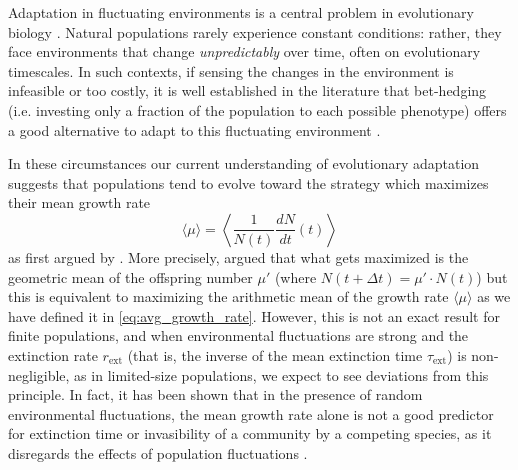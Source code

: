 \documentclass[aps,pre,reprint,10pt,superscriptaddress]{revtex4-2}
\begin{document}
Adaptation in fluctuating environments is a central problem in evolutionary biology \cite{gillespieNaturalSelectionVariances1977,kingscollegeRiskUncertaintyEvolutionary1982,kussellPhenotypicDiversityPopulation2005,ashcroftFixationFinitePopulations2014,patraEmergencePhenotypeSwitching2015,huftonIntrinsicNoiseSystems2016,wienandEvolutionFluctuatingPopulation2017,saakianAlleleFixationProbability2019,taitelbaumPopulationDynamicsChanging2020,camachomateuPhenotypicdependentVariabilityEmergence2021,kaushikTimeFixationChanging2021,collectiveEconomicPrinciplesCell,nakashimaPopulationDynamicsModels2023}. Natural populations rarely experience constant conditions: rather, they face environments that change \emph{unpredictably} over time, often on evolutionary timescales. In such contexts, if sensing the changes in the environment is infeasible or too costly, it is well established in the literature that bet-hedging (i.e. investing only a fraction of the population to each possible phenotype) offers a good alternative to adapt to this fluctuating environment \cite{kussellPhenotypicDiversityPopulation2005,patraEmergencePhenotypeSwitching2015,huftonPhenotypicSwitchingPopulations2018,camachomateuPhenotypicdependentVariabilityEmergence2021,collectiveEconomicPrinciplesCell,nakashimaPopulationDynamicsModels2023}.

In these circumstances our current understanding of evolutionary adaptation suggests that populations tend to evolve toward the strategy which maximizes their mean growth rate
\begin{equation} \label{eq:avg_growth_rate}
    \langle\mu\rangle=\left\langle\frac{1}{N(t)}\frac{dN}{dt}(t)\right\rangle
\end{equation}
as first argued by \cite{gillespieNaturalSelectionVariances1977}. More precisely, \cite{gillespieNaturalSelectionVariances1977} argued that what gets maximized is the geometric mean of the offspring number $\mu'$ (where $N(t+\Delta t)=\mu'\cdot N(t)$) but this is equivalent to maximizing the arithmetic mean of the growth rate $\langle\mu\rangle$ as we have defined it in \cref{eq:avg_growth_rate}. However, this is not an exact result for finite populations, and when environmental fluctuations are strong and the extinction rate $r_\text{ext}$ (that is, the inverse of the mean extinction time $\tau_\text{ext}$) is non-negligible, as in limited-size populations, we expect to see deviations from this principle. In fact, it has been shown that in the presence of random environmental fluctuations, the mean growth rate alone is not a good predictor for extinction time or invasibility of a community by a competing species, as it disregards the effects of population fluctuations \cite{pandeMeanGrowthRate2020,pandeQuantifyingInvasibility2022,davila-romeroExtinctionAgentbasedCollective2026}.
\end{document}
